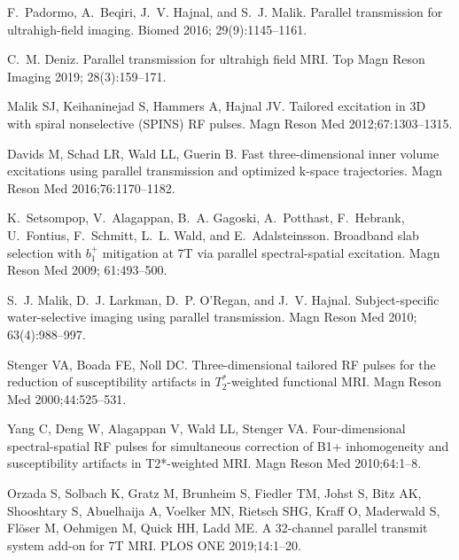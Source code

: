 \documentclass[11pt]{article}
\begin{document}
\begin{thebibliography}{10}
F.~Padormo, A.~Beqiri, J.~V. Hajnal, and S.~J. Malik.
\newblock Parallel transmission for ultrahigh-field imaging.
 Biomed 2016; 29(9):1145--1161.

C.~M. Deniz.
\newblock Parallel transmission for ultrahigh field {MRI}.
\newblock Top Magn Reson Imaging 2019; 28(3):159--171.

Malik SJ, Keihaninejad S, Hammers A, Hajnal JV.
\newblock Tailored excitation in {3D} with spiral nonselective {(SPINS) RF}
  pulses.
\newblock Magn Reson Med 2012;\hspace{0pt}67:1303--1315.

Davids M, Schad LR, Wald LL, Guerin B.
\newblock Fast three-dimensional inner volume excitations using parallel
  transmission and optimized k-space trajectories.
\newblock Magn Reson Med 2016;\hspace{0pt}76:1170--1182.

K.~Setsompop, V.~Alagappan, B.~A. Gagoski, A.~Potthast, F.~Hebrank, U.~Fontius,
  F.~Schmitt, L.~L. Wald, and E.~Adalsteinsson.
\newblock Broadband slab selection with $b_1^+$ mitigation at 7{T} via parallel
  spectral-spatial excitation.
\newblock Magn Reson Med 2009; 61:493--500.

S.~J. Malik, D.~J. Larkman, D.~P. O'Regan, and J.~V. Hajnal.
\newblock Subject-specific water-selective imaging using parallel transmission.
\newblock Magn Reson Med 2010; 63(4):988--997.

Stenger VA, Boada FE, Noll DC.
\newblock Three-dimensional tailored {RF} pulses for the reduction of
  susceptibility artifacts in {$T_2^*$}-weighted functional {MRI}.
\newblock Magn Reson Med 2000;\hspace{0pt}44:525--531.

Yang C, Deng W, Alagappan V, Wald LL, Stenger VA.
\newblock Four-dimensional spectral-spatial {RF} pulses for simultaneous
  correction of {B1+} inhomogeneity and susceptibility artifacts in
  {T2*}-weighted {MRI}.
\newblock Magn Reson Med 2010;\hspace{0pt}64:1--8.

Orzada S, Solbach K, Gratz M, Brunheim S, Fiedler TM, Johst S, Bitz AK,
  Shooshtary S, Abuelhaija A, Voelker MN, Rietsch SHG, Kraff O, Maderwald S,
  Fl\"oser M, Oehmigen M, Quick HH, Ladd ME.
\newblock A 32-channel parallel transmit system add-on for {7T MRI}.
\newblock PLOS ONE 2019;\hspace{0pt}14:1--20.


\end{thebibliography}
\end{document}
